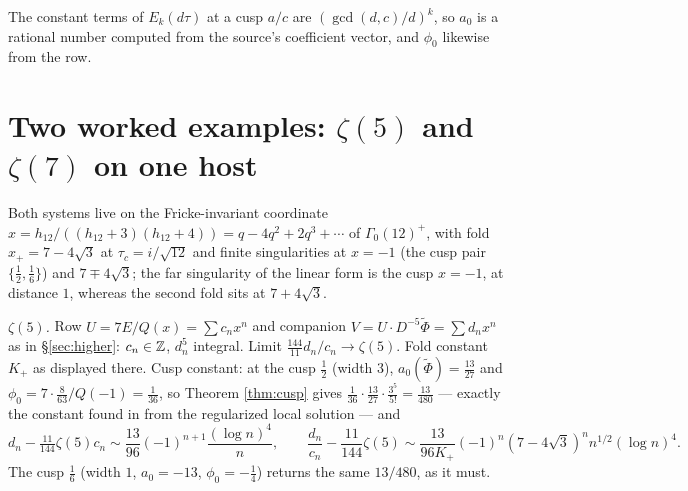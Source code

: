 \documentclass[11pt]{amsart}
\theoremstyle{definition}
\theoremstyle{remark}
\begin{document}
The constant terms of $E_k(d\tau)$ at a cusp $a/c$ are $(\gcd(d,c)/d)^k$, so $a_0$ is a rational number computed from the source's coefficient vector, and $\phi_0$ likewise from the row.

\section{Two worked examples: $\zeta(5)$ and $\zeta(7)$ on one host}\label{sec:examples}

Both systems live on the Fricke-invariant coordinate $x=h_{12}/((h_{12}+3)(h_{12}+4))=q-4q^2+2q^3+\cdots$ of $\Gamma_0(12)^+$, with fold $x_+=7-4\sqrt3$ at $\tau_c=i/\sqrt{12}$ and finite singularities at $x=-1$ (the cusp pair $\{\tfrac12,\tfrac16\}$) and $7\mp4\sqrt3$; the far singularity of the linear form is the cusp $x=-1$, at distance $1$, whereas the second fold sits at $7+4\sqrt3$.

\emph{$\zeta(5)$.} Row $U=7E/Q(x)=\sum c_nx^n$ and companion $V=U\cdot D^{-5}\widetilde\Phi=\sum d_nx^n$ as in \S\ref{sec:higher}: $c_n\in\mathbb Z$, $d_n^5$ integral. Limit $\frac{144}{11}d_n/c_n\to\zeta(5)$. Fold constant $K_+$ as displayed there. Cusp constant: at the cusp $\tfrac12$ (width $3$), $a_0(\widetilde\Phi)=\frac{13}{27}$ and $\phi_0=7\cdot\frac{8}{63}/Q(-1)=\frac1{36}$, so Theorem \ref{thm:cusp} gives $\frac1{36}\cdot\frac{13}{27}\cdot\frac{3^5}{5!}=\frac{13}{480}$ — exactly the constant found in \cite{ProjSources} from the regularized local solution — and
$$d_n-\tfrac{11}{144}\zeta(5)c_n\sim\frac{13}{96}(-1)^{n+1}\frac{(\log n)^4}n,\qquad \frac{d_n}{c_n}-\frac{11}{144}\zeta(5)\sim\frac{13}{96K_+}(-1)^n(7-4\sqrt3)^nn^{1/2}(\log n)^4 .$$
The cusp $\tfrac16$ (width $1$, $a_0=-13$, $\phi_0=-\tfrac14$) returns the same $13/480$, as it must.
\end{document}
